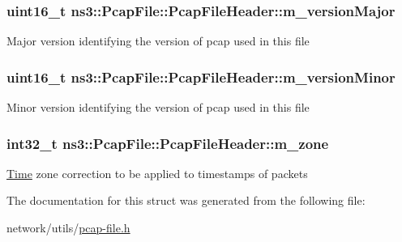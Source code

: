 \subsubsection[{\texorpdfstring{m\+\_\+version\+Major}{m_versionMajor}}]{\setlength{\rightskip}{0pt plus 5cm}uint16\+\_\+t ns3\+::\+Pcap\+File\+::\+Pcap\+File\+Header\+::m\+\_\+version\+Major}\hypertarget{structns3_1_1PcapFile_1_1PcapFileHeader_aad229620708f0556447252a2c737788d}{}\label{structns3_1_1PcapFile_1_1PcapFileHeader_aad229620708f0556447252a2c737788d}
Major version identifying the version of pcap used in this file 
\subsubsection[{\texorpdfstring{m\+\_\+version\+Minor}{m_versionMinor}}]{\setlength{\rightskip}{0pt plus 5cm}uint16\+\_\+t ns3\+::\+Pcap\+File\+::\+Pcap\+File\+Header\+::m\+\_\+version\+Minor}\hypertarget{structns3_1_1PcapFile_1_1PcapFileHeader_afb6cdefec3947135b53c8bbe05628927}{}\label{structns3_1_1PcapFile_1_1PcapFileHeader_afb6cdefec3947135b53c8bbe05628927}
Minor version identifying the version of pcap used in this file 
\subsubsection[{\texorpdfstring{m\+\_\+zone}{m_zone}}]{\setlength{\rightskip}{0pt plus 5cm}int32\+\_\+t ns3\+::\+Pcap\+File\+::\+Pcap\+File\+Header\+::m\+\_\+zone}\hypertarget{structns3_1_1PcapFile_1_1PcapFileHeader_aaa76da3051b3fe9cf8b37129d5510b1c}{}\label{structns3_1_1PcapFile_1_1PcapFileHeader_aaa76da3051b3fe9cf8b37129d5510b1c}
\hyperlink{classns3_1_1Time}{Time} zone correction to be applied to timestamps of packets 

The documentation for this struct was generated from the following file\+:\begin{DoxyCompactItemize}
\item 
network/utils/\hyperlink{pcap-file_8h}{pcap-\/file.\+h}\end{DoxyCompactItemize}
